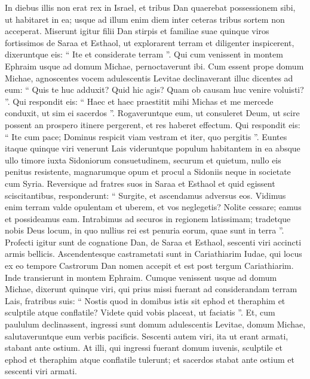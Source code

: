 \begin{biblechapter}
\begin{biblechapter}
\begin{biblechapter}
\begin{biblechapter}
\begin{biblechapter}
\begin{biblechapter}
\begin{biblechapter}
\begin{biblechapter}
\begin{biblechapter}
\begin{biblechapter}
\begin{biblechapter}
\begin{biblechapter}
\begin{biblechapter}
\begin{biblechapter}
\begin{biblechapter}
\begin{biblechapter}
\begin{biblechapter}
\begin{biblechapter}
\verse In diebus illis non erat rex in Israel, et tribus Dan quaerebat possessionem sibi, ut habitaret in ea; usque ad illum enim diem inter ceteras tribus sortem non acceperat. 
\verse Miserunt igitur filii Dan stirpis et familiae suae quinque viros fortissimos de Saraa et Esthaol, ut explorarent terram et diligenter inspicerent, dixeruntque eis: “ Ite et considerate terram ”. Qui cum venissent in montem Ephraim usque ad domum Michae, pernoctaverunt ibi. 
\verse Cum essent prope domum Michae, agnoscentes vocem adulescentis Levitae declinaverant illuc dicentes ad eum: “ Quis te huc adduxit? Quid hic agis? Quam ob causam huc venire voluisti? ”. 
\verse Qui respondit eis: “ Haec et haec praestitit mihi Michas et me mercede conduxit, ut sim ei sacerdos ”. 
\verse Rogaveruntque eum, ut consuleret Deum, ut scire possent an prospero itinere pergerent, et res haberet effectum. 
\verse Qui respondit eis: “ Ite cum pace; Dominus respicit viam vestram et iter, quo pergitis ”.
 \verse Euntes itaque quinque viri venerunt Lais videruntque populum habitantem in ea absque ullo timore iuxta Sidoniorum consuetudinem, securum et quietum, nullo eis penitus resistente, magnarumque opum et procul a Sidoniis neque in societate cum Syria.
 \verse Reversique ad fratres suos in Saraa et Esthaol et quid egissent sciscitantibus, responderunt: 
\verse “ Surgite, et ascendamus adversus eos. Vidimus enim terram valde opulentam et uberem, et vos neglegetis? Nolite cessare; eamus et possideamus eam. 
\verse Intrabimus ad securos in regionem latissimam; tradetque nobis Deus locum, in quo nullius rei est penuria eorum, quae sunt in terra ”.
 \verse Profecti igitur sunt de cognatione Dan, de Saraa et Esthaol, sescenti viri accincti armis bellicis. 
\verse Ascendentesque castrametati sunt in Cariathiarim Iudae, qui locus ex eo tempore Castrorum Dan nomen accepit et est post tergum Cariathiarim. 
\verse Inde transierunt in montem Ephraim.
 Cumque venissent usque ad domum Michae, 
\verse dixerunt quinque viri, qui prius missi fuerant ad considerandam terram Lais, fratribus suis: “ Nostis quod in domibus istis sit ephod et theraphim et sculptile atque conflatile? Videte quid vobis placeat, ut faciatis ”. 
\verse Et, cum paululum declinassent, ingressi sunt domum adulescentis Levitae, domum Michae, salutaveruntque eum verbis pacificis. 
\verse Sescenti autem viri, ita ut erant armati, stabant ante ostium. 
\verse At illi, qui ingressi fuerant domum iuvenis, sculptile et ephod et theraphim atque conflatile tulerunt; et sacerdos stabat ante ostium et sescenti viri armati. 

\end{biblechapter}
\end{biblechapter}
\end{biblechapter}
\end{biblechapter}
\end{biblechapter}
\end{biblechapter}
\end{biblechapter}
\end{biblechapter}
\end{biblechapter}
\end{biblechapter}
\end{biblechapter}
\end{biblechapter}
\end{biblechapter}
\end{biblechapter}
\end{biblechapter}
\end{biblechapter}
\end{biblechapter}
\end{biblechapter}
